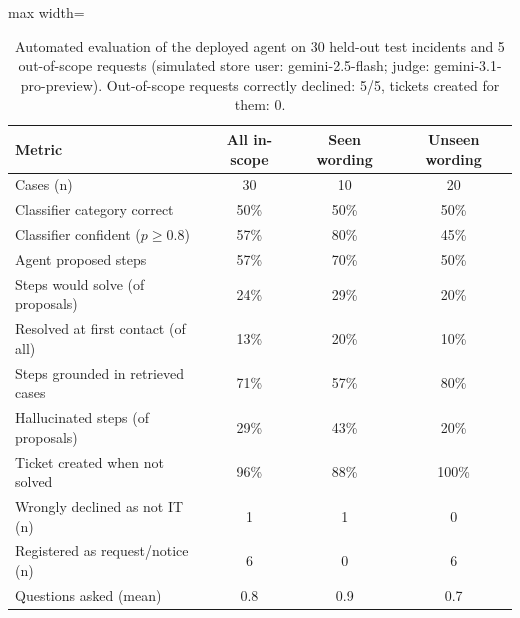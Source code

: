 \begin{table}[!t]
\centering
\caption{Automated evaluation of the deployed agent on 30 held-out test incidents and 5 out-of-scope requests (simulated store user: gemini-2.5-flash; judge: gemini-3.1-pro-preview). Out-of-scope requests correctly declined: 5/5, tickets created for them: 0.}
\label{tab:agent_eval_v2}
\footnotesize
\begin{adjustbox}{max width=\columnwidth}
\begin{tabular}{lccc}
\hline
Metric & All in-scope & Seen wording & Unseen wording \\
\hline
Cases (n) & 30 & 10 & 20 \\
Classifier category correct & 50\% & 50\% & 50\% \\
Classifier confident ($p\ge0.8$) & 57\% & 80\% & 45\% \\
Agent proposed steps & 57\% & 70\% & 50\% \\
Steps would solve (of proposals) & 24\% & 29\% & 20\% \\
Resolved at first contact (of all) & 13\% & 20\% & 10\% \\
Steps grounded in retrieved cases & 71\% & 57\% & 80\% \\
Hallucinated steps (of proposals) & 29\% & 43\% & 20\% \\
Ticket created when not solved & 96\% & 88\% & 100\% \\
Wrongly declined as not IT (n) & 1 & 1 & 0 \\
Registered as request/notice (n) & 6 & 0 & 6 \\
Questions asked (mean) & 0.8 & 0.9 & 0.7 \\
\hline
\end{tabular}
\end{adjustbox}
\end{table}
